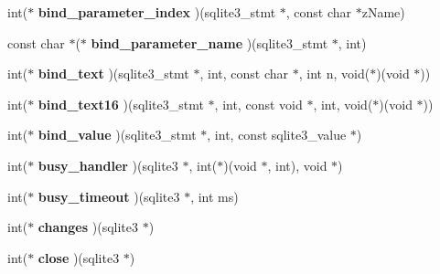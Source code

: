 \begin{DoxyCompactItemize}
\mbox{\label{structsqlite3__api__routines_a1985681b1e13047a8aae17676debb39d}} 
int($\ast$ {\bfseries bind\+\_\+parameter\+\_\+index} )(sqlite3\+\_\+stmt $\ast$, const char $\ast$z\+Name)
\item 
\mbox{\label{structsqlite3__api__routines_aff41be2d08dbacf60407b53567d6bead}} 
const char $\ast$($\ast$ {\bfseries bind\+\_\+parameter\+\_\+name} )(sqlite3\+\_\+stmt $\ast$, int)
\item 
\mbox{\label{structsqlite3__api__routines_a4e64c1e01f7317ce0924683bf26b165a}} 
int($\ast$ {\bfseries bind\+\_\+text} )(sqlite3\+\_\+stmt $\ast$, int, const char $\ast$, int n, void($\ast$)(void $\ast$))
\item 
\mbox{\label{structsqlite3__api__routines_a4613c5fa0a1fac009914ddd0f4415cfd}} 
int($\ast$ {\bfseries bind\+\_\+text16} )(sqlite3\+\_\+stmt $\ast$, int, const void $\ast$, int, void($\ast$)(void $\ast$))
\item 
\mbox{\label{structsqlite3__api__routines_aca47715615cc037cd2f850e8c87cd68d}} 
int($\ast$ {\bfseries bind\+\_\+value} )(sqlite3\+\_\+stmt $\ast$, int, const sqlite3\+\_\+value $\ast$)
\item 
\mbox{\label{structsqlite3__api__routines_a4dd578712242bb36acf8568f1c0da278}} 
int($\ast$ {\bfseries busy\+\_\+handler} )(sqlite3 $\ast$, int($\ast$)(void $\ast$, int), void $\ast$)
\item 
\mbox{\label{structsqlite3__api__routines_a403a82d983e3a60444761e4f78d6269c}} 
int($\ast$ {\bfseries busy\+\_\+timeout} )(sqlite3 $\ast$, int ms)
\item 
\mbox{\label{structsqlite3__api__routines_a1379bef0cb6e5e352dc26a34e2d02477}} 
int($\ast$ {\bfseries changes} )(sqlite3 $\ast$)
\item 
\mbox{\label{structsqlite3__api__routines_a26f93f921a5f6709be46902616ca8bcf}} 
int($\ast$ {\bfseries close} )(sqlite3 $\ast$)
\item 

\end{DoxyCompactItemize}
